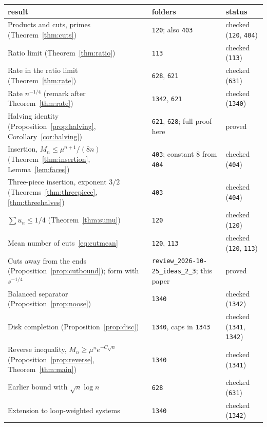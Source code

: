 \begin{center}
\footnotesize
\begin{tabular}{>{\raggedright\arraybackslash}p{}>{\raggedright\arraybackslash}p{}>{\raggedright\arraybackslash}p{}}
\toprule
result & folders & status\\
\midrule
Products and cuts, primes (Theorem~\ref{thm:cuts}) & \texttt{120}; also \texttt{403} & checked (\texttt{120}, \texttt{404})\\
Ratio limit (Theorem~\ref{thm:ratio}) & \texttt{113} & checked (\texttt{113})\\
Rate in the ratio limit (Theorem~\ref{thm:rate}) & \texttt{628}, \texttt{621} & checked (\texttt{631})\\
Rate $n^{-1/4}$ (remark after Theorem~\ref{thm:rate}) & \texttt{1342}, \texttt{621} & checked (\texttt{1340})\\
Halving identity (Proposition~\ref{prop:halving}, Corollary~\ref{cor:halving}) & \texttt{621}, \texttt{628}; full proof here & proved\\
Insertion, $M_n\le\mu^{n+1}/(8n)$ (Theorem~\ref{thm:insertion}, Lemma~\ref{lem:faces}) & \texttt{403}; constant $8$ from \texttt{404} & checked (\texttt{404})\\
Three-piece insertion, exponent $3/2$ (Theorems~\ref{thm:threepiece}, \ref{thm:threehalves}) & \texttt{403} & checked (\texttt{404})\\
$\sum u_n\le1/4$ (Theorem~\ref{thm:sumu}) & \texttt{120} & checked (\texttt{120})\\
Mean number of cuts~\eqref{eq:cutmean} & \texttt{120}, \texttt{113} & checked (\texttt{120}, \texttt{113})\\
Cuts away from the ends (Proposition~\ref{prop:cutbound}); form with $s^{-1/4}$ & \texttt{review\_2026-10-25\_\allowbreak ideas\_2\_3}; this paper & proved\\
Balanced separator (Proposition~\ref{prop:noose}) & \texttt{1340} & checked (\texttt{1342})\\
Disk completion (Proposition~\ref{prop:disc}) & \texttt{1340}, caps in \texttt{1343} & checked (\texttt{1341}, \texttt{1342})\\
Reverse inequality, $M_n\ge\mu^ne^{-C\sqrt n}$ (Proposition~\ref{prop:reverse}, Theorem~\ref{thm:main}) & \texttt{1340} & checked (\texttt{1341})\\
Earlier bound with $\sqrt n\log n$ & \texttt{628} & checked (\texttt{631})\\
Extension to loop-weighted systems & \texttt{1340} & checked (\texttt{1342})\\

\end{tabular}
\end{center}
